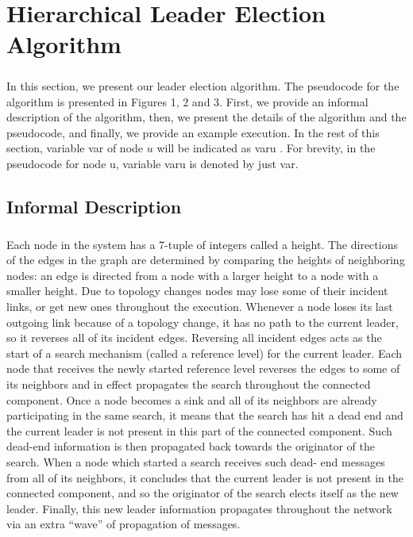 \chapter{Hierarchical Leader Election Algorithm}
\paragraph{}In this section, we present our leader election algorithm. The pseudocode for the algorithm is presented in Figures 1, 2 and 3. First, we provide an informal description of the algorithm, then, we present the details of the algorithm and the pseudocode, and finally, we provide an example execution. In the rest of this section, variable var of node $u$ will be indicated as varu . For brevity, in the pseudocode for node u, variable varu is denoted by just var.
\section{Informal Description}
\paragraph{}Each node in the system has a 7-tuple of integers called a height. The directions of the edges in the graph are determined by comparing the heights of neighboring nodes: an edge is directed from a node with a larger height to a node with a smaller height. Due to topology changes nodes may lose some of their incident links, or get new ones throughout the execution. Whenever a node loses its last outgoing link because of a topology change, it has no path to the current leader, so it reverses all of its incident edges. Reversing all incident edges acts as the start of a search mechanism (called a reference level) for the current leader. Each node that receives the newly started reference level reverses the edges to some of its neighbors and in effect propagates the search throughout the connected component. Once a node becomes a sink and all of its neighbors are already participating in the same search, it means that the search has hit a dead end and the current leader is not present in this part of the connected component. Such dead-end information is then propagated back towards the originator of the search. When a node which started a search receives such dead- end messages from all of its neighbors, it concludes that the current leader is not present in the connected component, and so the originator of the search elects itself as the new leader. Finally, this new leader information propagates throughout the network via an extra “wave” of propagation of messages.
